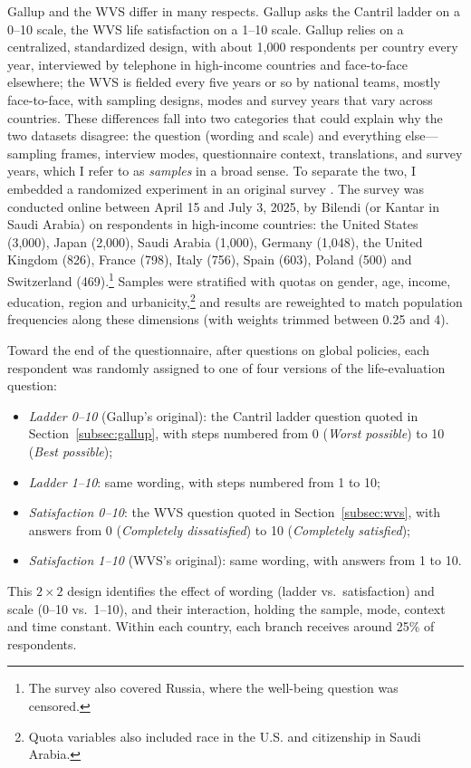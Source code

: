 \documentclass[12pt]{article}
\begin{document}
Gallup and the WVS differ in many respects. Gallup asks the Cantril ladder on a 0--10 scale, the WVS life satisfaction on a 1--10 scale. Gallup relies on a centralized, standardized design, with about 1,000 respondents per country every year, interviewed by telephone in high-income countries and face-to-face elsewhere; the WVS is fielded every five years or so by national teams, mostly face-to-face, with sampling designs, modes and survey years that vary across countries. These differences fall into two categories that could explain why the two datasets disagree: the question (wording and scale) and everything else---sampling frames, interview modes, questionnaire context, translations, and survey years, which I refer to as \textit{samples} in a broad sense. To separate the two, I embedded a randomized experiment in an original survey \citep{fabre_public_2025}. The survey was conducted online between April 15 and July 3, 2025, by Bilendi (or Kantar in Saudi Arabia) on \nFabre respondents in \nFabreCountries high-income countries: the United States (3,000), Japan (2,000), Saudi Arabia (1,000), Germany (1,048), the United Kingdom (826), France (798), Italy (756), Spain (603), Poland (500) and Switzerland (469).\footnote{The survey also covered Russia, where the well-being question was censored.} Samples were stratified with quotas on gender, age, income, education, region and urbanicity,\footnote{Quota variables also included race in the U.S. and citizenship in Saudi Arabia.} and results are reweighted to match population frequencies along these dimensions (with weights trimmed between 0.25 and 4).

Toward the end of the questionnaire, after questions on global policies, each respondent was randomly assigned to one of four versions of the life-evaluation question:
\begin{itemize}
    \item \textit{Ladder 0--10} (Gallup's original): the Cantril ladder question quoted in Section~\ref{subsec:gallup}, with steps numbered from 0 (\textit{Worst possible}) to 10 (\textit{Best possible});
    \item \textit{Ladder 1--10}: same wording, with steps numbered from 1 to 10;
    \item \textit{Satisfaction 0--10}: the WVS question quoted in Section~\ref{subsec:wvs}, with answers from 0 (\textit{Completely dissatisfied}) to 10 (\textit{Completely satisfied});
    \item \textit{Satisfaction 1--10} (WVS's original): same wording, with answers from 1 to 10.
\end{itemize}
This $2 \times 2$ design identifies the effect of wording (ladder vs.\ satisfaction) and scale (0--10 vs.\ 1--10), and their interaction, holding the sample, mode, context and time constant. Within each country, each branch receives around 25\% of respondents.
\end{document}
